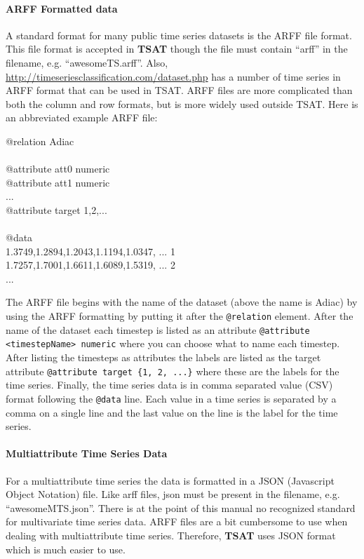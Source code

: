 \documentclass[titlepage, letterpaper, 12pt]{article}
\newenvironment{allintypewriter}{\ttfamily}{\par}
\newcommand\TSAT{\textbf{TSAT}}
\begin{document}
\paragraph{ARFF Formatted data}
A standard format for many public time series datasets is the ARFF file format.  This file format is accepted in {\TSAT} though the file must contain ``arff'' in the filename, e.g. ``awesomeTS.arff''.  Also, \url{http://timeseriesclassification.com/dataset.php} has a number of time series in ARFF format that can be used in TSAT.  ARFF files are more complicated than both the column and row formats, but is more widely used outside TSAT.  Here is an abbreviated example ARFF file:\\
\begin{samepage}
\begin{allintypewriter}
	\noindent @relation Adiac\\ \\
	@attribute att0 numeric\\
	@attribute att1 numeric\\
	...\\
	@attribute target {1,2,...}\\ \\
	@data\\
	1.3749,1.2894,1.2043,1.1194,1.0347, ... 1\\
	1.7257,1.7001,1.6611,1.6089,1.5319, ... 2\\
	...
\end{allintypewriter}
\end{samepage}
The ARFF file begins with the name of the dataset (above the name is Adiac) by using the ARFF formatting by putting it after the \texttt{@relation} element. After the name of the dataset each timestep is listed as an attribute \texttt{@attribute <timestepName> numeric} where you can choose what to name each timestep. After listing the timesteps as attributes the labels are listed as the target attribute \texttt{@attribute target \{1, 2, ...\}} where these are the labels for the time series. Finally, the time series data is in comma separated value (CSV) format following the \texttt{@data} line.  Each value in a time series is separated by a comma on a single line and the last value on the line is the label for the time series.

\paragraph{Multiattribute Time Series Data}
For a multiattribute time series the data is formatted in a JSON (Javascript Object Notation) file.  Like arff files, json must be present in the filename, e.g. ``awesomeMTS.json''.  There is at the point of this manual no recognized standard for multivariate time series data.  ARFF files are a bit cumbersome to use when dealing with multiattribute time series.  Therefore, {\TSAT} uses JSON format which is much easier to use.  
\end{document}
